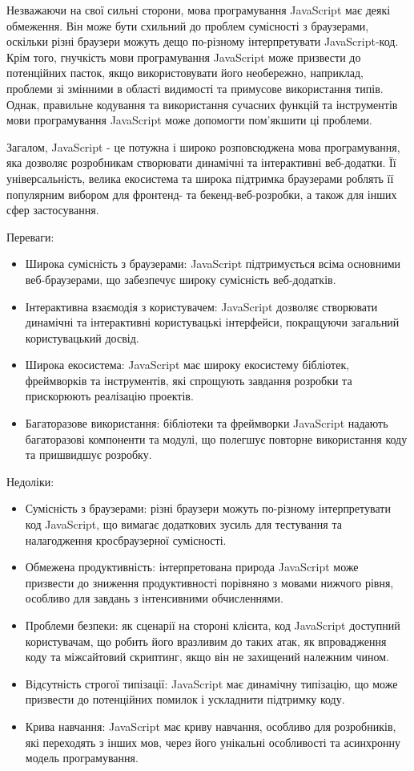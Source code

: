 Незважаючи на свої сильні сторони, мова програмування JavaScript має деякі обмеження. Він може бути схильний до проблем сумісності з браузерами, оскільки різні браузери можуть дещо по-різному інтерпретувати JavaScript-код. Крім того, гнучкість мови програмування JavaScript може призвести до потенційних пасток, якщо використовувати його необережно, наприклад, проблеми зі змінними в області видимості та примусове використання типів. Однак, правильне кодування та використання сучасних функцій та інструментів мови програмування JavaScript може допомогти пом'якшити ці проблеми.

Загалом, JavaScript - це потужна і широко розповсюджена мова програмування, яка дозволяє розробникам створювати динамічні та інтерактивні веб-додатки. Її універсальність, велика екосистема та широка підтримка браузерами роблять її популярним вибором для фронтенд- та бекенд-веб-розробки, а також для інших сфер застосування.

Переваги:
\begin{itemize}
    \item Широка сумісність з браузерами: JavaScript підтримується всіма основними веб-браузерами, що забезпечує широку сумісність веб-додатків.
    \item Інтерактивна взаємодія з користувачем: JavaScript дозволяє    створювати динамічні та інтерактивні користувацькі інтерфейси, покращуючи загальний користувацький досвід.
    \item Широка екосистема: JavaScript має широку екосистему бібліотек, фреймворків та інструментів, які спрощують завдання розробки та прискорюють реалізацію проектів.
    \item Багаторазове використання: бібліотеки та фреймворки JavaScript надають багаторазові компоненти та модулі, що полегшує повторне використання коду та пришвидшує розробку.
\end{itemize}

Недоліки:
\begin{itemize}
    \item Сумісність з браузерами: різні браузери можуть по-різному інтерпретувати код JavaScript, що вимагає додаткових зусиль для тестування та налагодження кросбраузерної сумісності.
    \item Обмежена продуктивність: інтерпретована природа JavaScript може призвести до зниження продуктивності порівняно з мовами нижчого рівня, особливо для завдань з інтенсивними обчисленнями.
    \item Проблеми безпеки: як сценарії на стороні клієнта, код JavaScript доступний користувачам, що робить його вразливим до таких атак, як впровадження коду та міжсайтовий скриптинг, якщо він не захищений належним чином.
    \item Відсутність строгої типізації: JavaScript має динамічну типізацію, що може призвести до потенційних помилок і ускладнити підтримку коду.
    \item Крива навчання: JavaScript має криву навчання, особливо для розробників, які переходять з інших мов, через його унікальні особливості та асинхронну модель програмування.
\end{itemize}
